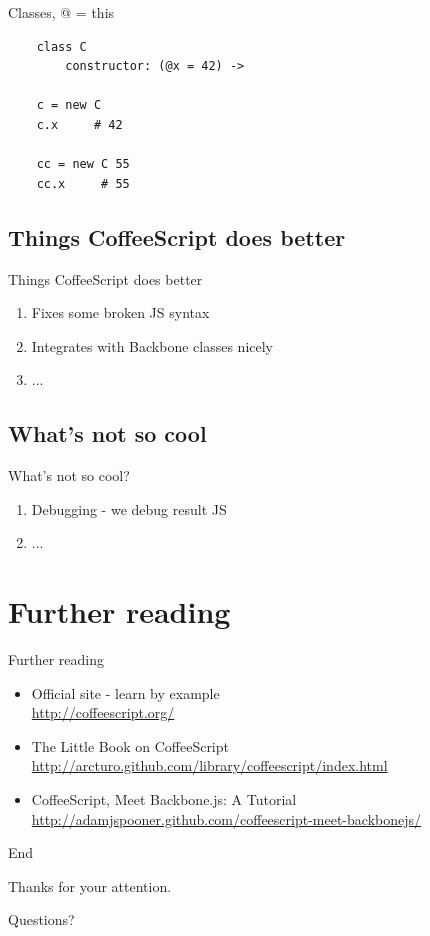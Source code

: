 \documentclass[xcolor=dvipsnames]{beamer}
\newcommand{\slide}[1]{\begin{frame}[fragile]{{#1}}}
\newcommand{\coffee}{\begin{verbatim}}
\begin{document}
\slide{Classes, @ = this}
    
    \coffee
    class C
        constructor: (@x = 42) ->

    c = new C
    c.x     # 42

    cc = new C 55
    cc.x     # 55

    \end{verbatim}
\end{frame}


\subsection{Things CoffeeScript does better}
\slide{Things CoffeeScript does better}
    \begin{enumerate}
        \item Fixes some broken JS syntax
        \item Integrates with Backbone classes nicely
        \item ...
    \end{enumerate}
\end{frame}


\subsection{What's not so cool}
\slide{What's not so cool?}
    \begin{enumerate}
        \item Debugging - we debug result JS
        \item ...
    \end{enumerate}
\end{frame}


\section{Further reading}
\slide{Further reading}
    \begin{itemize}
        \item Official site - learn by example \\
            \url{http://coffeescript.org/}
        \item The Little Book on CoffeeScript \\
            \url{http://arcturo.github.com/library/coffeescript/index.html}
        \item CoffeeScript, Meet Backbone.js: A Tutorial \\
            \url{http://adamjspooner.github.com/coffeescript-meet-backbonejs/}
    \end{itemize}
\end{frame}


\slide{End}
    \begin{center}
        Thanks for your attention.
        
        \vspace{2 cm}
        \pause
        Questions?
    \end{center}
\end{frame}
\end{document}
